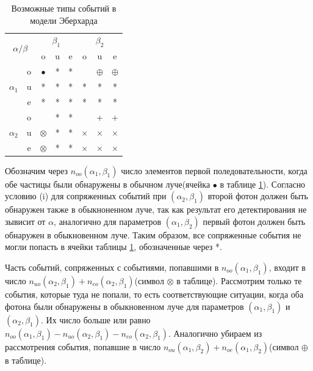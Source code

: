 \documentclass[%
master,         %
subf,           %
href,           %
colorlinks=true %
]{disser}
\numberwithin{equation}{section}
\numberwithin{figure}{section}
\begin{document}
\begin{table}
\centering
\begin{tabular}{|c|c|c|c|c|c|c|c|}
\hline 
\multicolumn{2}{|c|}{\multirow{2}{*}{$\alpha / \beta$}}  & \multicolumn{3}{c|}{$\beta_1$} & \multicolumn{3}{c|}{$\beta_2$} \\ 
\cline{3-8}
\multicolumn{2}{|c|}{}  & o & u & e & o & u & e \\ 
\hline 
\multirow{3}{*}{$\alpha_1$} & o & $\bullet$ & * & * &  & $\oplus$ & $\oplus$ \\ 
\cline{2-8}
 & u & * & * & * & * & * & * \\ 
\cline{2-8}
 & e & * & * & * & * & * & * \\ 
\hline 
\multirow{3}{*}{$\alpha_2$} & o &  & * & * &  & + & + \\ 
\cline{2-8}
 & u & $\otimes$ & * & * & $\times$ & $\times$ & $\times$ \\ 
\cline{2-8}
 & e & $\otimes$ & * & * & $\times$ & $\times$ & $\times$ \\ 
\hline 
\end{tabular} 
\caption{Возможные типы событий в модели Эберхарда}
\label{tab:Eberhard_table}
\end{table}

Обозначим через $n_{oo}(\alpha_1, \beta_1)$ число элементов первой поледовательности, когда обе частицы были обнаружены в обычном луче(ячейка $\bullet$ в таблице \ref{tab:Eberhard_table}). Согласно условию (i) для сопряженных событий при $(\alpha_2, \beta_1)$ второй фотон должен быть обнаружен также в обыкноненном луче, так как результат его детектирования не зывисит от $\alpha$, аналогично для параметров $(\alpha_1, \beta_2)$ первый фотон должен быть обнаружен в обыкновенном луче. Таким образом, все сопряженные события не могли попасть в ячейки таблицы \ref{tab:Eberhard_table}, обозначенные через *.

Часть событий, сопряженных с событиями, попавшими в $n_{oo}(\alpha_1, \beta_1)$, входит в число $n_{uo}(\alpha_2, \beta_1) + n_{eo}(\alpha_2, \beta_1)$(символ $\otimes$ в таблице). Рассмотрим только те события, которые туда не попали, то есть соответствующие ситуации, когда оба фотона были обнаружены в обыкновенном луче для параметров $(\alpha_1, \beta_1)$ и $(\alpha_2, \beta_1)$. Их число больше или равно $n_{oo}(\alpha_1, \beta_1) - n_{uo}(\alpha_2, \beta_1) - n_{eo}(\alpha_2, \beta_1)$. Аналогично убираем из рассмотрения события, попавшие в число $n_{ou}(\alpha_1, \beta_2) + n_{oe}(\alpha_1, \beta_2)$(символ $\oplus$ в таблице). 
\end{document}
